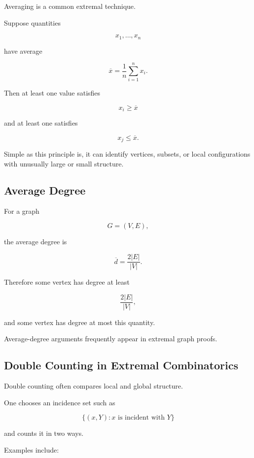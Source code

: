 Averaging is a common extremal technique.

Suppose quantities

\[
x_1,\ldots,x_n
\]

have average

\[
\overline{x}
=
\frac1n
\sum_{i=1}^{n}x_i.
\]

Then at least one value satisfies

\[
x_i\geq\overline{x}
\]

and at least one satisfies

\[
x_j\leq\overline{x}.
\]

Simple as this principle is, it can identify vertices, subsets, or local
configurations with unusually large or small structure.

\subsection{Average Degree}
\label{subsec:average-degree-extremal}

For a graph

\[
G=(V,E),
\]

the average degree is

\[
\boxed{
\overline{d}
=
\frac{2|E|}{|V|}.
}
\]

Therefore some vertex has degree at least

\[
\frac{2|E|}{|V|},
\]

and some vertex has degree at most this quantity.

Average-degree arguments frequently appear in extremal graph proofs.

\subsection{Double Counting in Extremal Combinatorics}
\label{subsec:double-counting-extremal}

Double counting often compares local and global structure.

One chooses an incidence set such as

\[
\boxed{
\{
(x,Y):
x\text{ is incident with }Y
\}
}
\]

and counts it in two ways.

Examples include:

